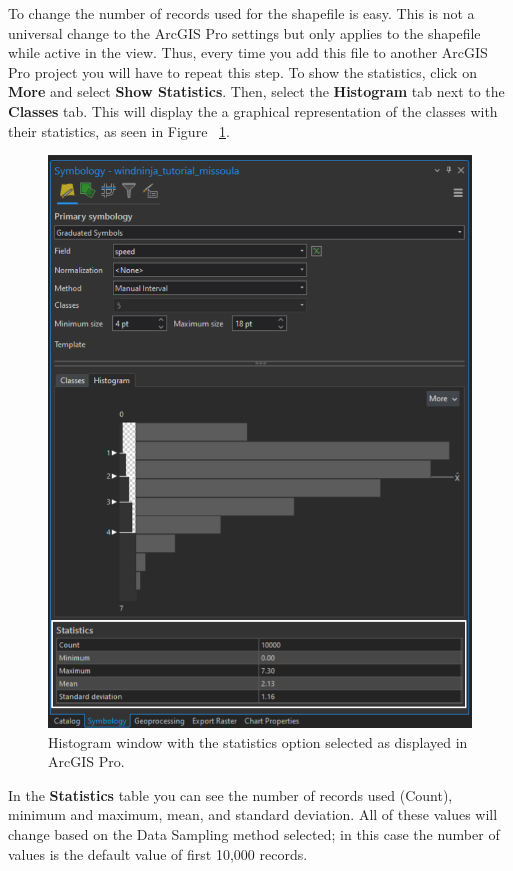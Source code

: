 \documentclass[12pt]{article}
\begin{document}
\pagebreak

To change the number of records used for the shapefile is easy. This is not a universal change to the ArcGIS Pro settings but only applies to the shapefile while active in the view. Thus, every time you add this file to another ArcGIS Pro project you will have to repeat this step. To show the statistics, click on \textbf{More} and select \textbf{Show Statistics}. Then, select the \textbf{Histogram} tab next to the \textbf{Classes} tab. This will display the a graphical representation of the classes with their statistics, as seen in Figure ~\ref{fig:Figure18}.

\begin{figure}[H]
	\centering
	\includegraphics[scale=0.42]{arc_18.png}
	\caption{Histogram window with the statistics option selected as displayed in ArcGIS Pro.}
\label{fig:Figure18}
\end{figure}

In the \textbf{Statistics} table you can see the number of records used (Count), minimum and maximum, mean, and standard deviation. All of these values will change based on the Data Sampling method selected; in this case the number of values is the default value of first 10,000 records.  
\end{document}
